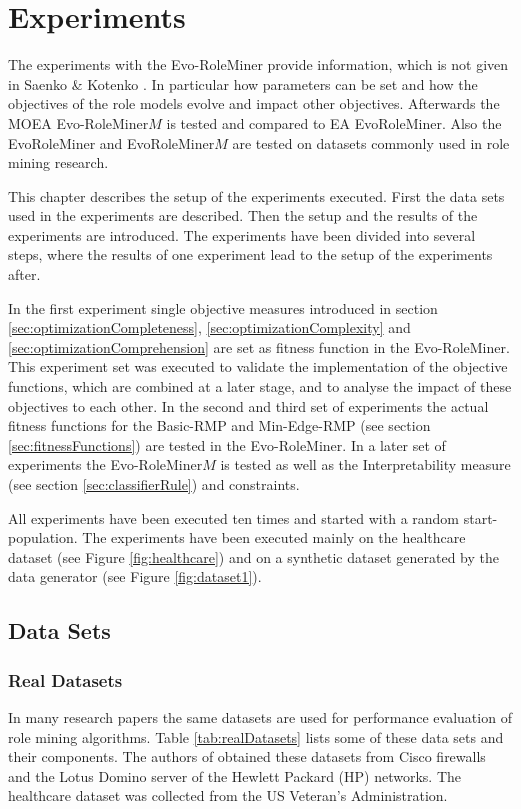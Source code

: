\newpage
\chapter{Experiments}
\label{sec:experiments}
The experiments with the Evo-RoleMiner provide information, which is not given in Saenko \& Kotenko \cite{saenko2012design}. In particular how parameters can be set and how the objectives of the role models evolve and impact other objectives. Afterwards the MOEA Evo-RoleMiner$M$ is tested and compared to EA EvoRoleMiner. Also the EvoRoleMiner and EvoRoleMiner$M$ are tested on datasets commonly used in role mining research.

This chapter describes the setup of the experiments executed. First the data sets used in the experiments are described. Then the setup and the results of the experiments are introduced. The experiments have been divided into several steps, where the results of one experiment lead to the setup of the experiments after.

In the first experiment  single objective measures introduced in section \ref{sec:optimizationCompleteness}, \ref{sec:optimizationComplexity} and \ref{sec:optimizationComprehension} are set as fitness function in the Evo-RoleMiner. This experiment set was executed to validate the implementation of the objective functions, which are combined at a later stage, and to analyse the impact of these objectives to each other. In the second and third set of experiments the actual fitness functions for the Basic-RMP and Min-Edge-RMP (see section \ref{sec:fitnessFunctions}) are tested in the Evo-RoleMiner. In a later set of experiments the Evo-RoleMiner$M$ is tested as well as the Interpretability measure (see section \ref{sec:classifierRule}) and constraints.

All experiments have been executed ten times and started with a random start-population. The experiments have been executed mainly on the healthcare dataset (see Figure \ref{fig:healthcare}) and on a synthetic dataset generated by the data generator (see Figure \ref{fig:dataset1}).

\section{Data Sets}
\subsection{Real Datasets}
In many research papers the same datasets are used for performance evaluation of role mining algorithms. Table \ref{tab:realDatasets} lists some of these data sets and their components. The authors of \cite{Ene} obtained these datasets from Cisco firewalls and the Lotus Domino server of the Hewlett Packard (HP) networks. The healthcare dataset was collected from the US Veteran’s Administration.

